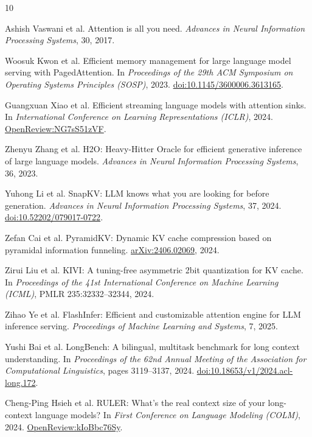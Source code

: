 \documentclass[10pt]{article}
\begin{document}
\begingroup
\small
\begin{thebibliography}{10}
\setlength{\itemsep}{0.45em}
\setlength{\parsep}{0pt}

Ashish Vaswani et al.
\newblock Attention is all you need.
\newblock \emph{Advances in Neural Information Processing Systems}, 30, 2017.

Woosuk Kwon et al.
\newblock Efficient memory management for large language model serving with PagedAttention.
\newblock In \emph{Proceedings of the 29th ACM Symposium on Operating Systems
Principles (SOSP)}, 2023.  \href{https://doi.org/10.1145/3600006.3613165}{doi:10.1145/3600006.3613165}.

Guangxuan Xiao et al.
\newblock Efficient streaming language models with attention sinks.
\newblock In \emph{International Conference on Learning Representations (ICLR)},
2024.  \href{https://openreview.net/forum?id=NG7sS51zVF}{OpenReview:NG7sS51zVF}.

Zhenyu Zhang et al.
\newblock H2O: Heavy-Hitter Oracle for efficient generative inference of large language models.
\newblock \emph{Advances in Neural Information Processing Systems}, 36, 2023.

Yuhong Li et al.
\newblock SnapKV: LLM knows what you are looking for before generation.
\newblock \emph{Advances in Neural Information Processing Systems}, 37, 2024.
\href{https://doi.org/10.52202/079017-0722}{doi:10.52202/079017-0722}.

Zefan Cai et al.
\newblock PyramidKV: Dynamic KV cache compression based on pyramidal information funneling.
\newblock \href{https://arxiv.org/abs/2406.02069}{arXiv:2406.02069}, 2024.

Zirui Liu et al.
\newblock KIVI: A tuning-free asymmetric 2bit quantization for KV cache.
\newblock In \emph{Proceedings of the 41st International Conference on Machine
Learning (ICML)}, PMLR 235:32332--32344, 2024.

Zihao Ye et al.
\newblock FlashInfer: Efficient and customizable attention engine for LLM inference serving.
\newblock \emph{Proceedings of Machine Learning and Systems}, 7, 2025.

Yushi Bai et al.
\newblock LongBench: A bilingual, multitask benchmark for long context understanding.
\newblock In \emph{Proceedings of the 62nd Annual Meeting of the Association for
Computational Linguistics}, pages 3119--3137, 2024.
\href{https://doi.org/10.18653/v1/2024.acl-long.172}{doi:10.18653/v1/2024.acl-long.172}.

Cheng-Ping Hsieh et al.
\newblock RULER: What's the real context size of your long-context language models?
\newblock In \emph{First Conference on Language Modeling (COLM)}, 2024.
\href{https://openreview.net/forum?id=kIoBbc76Sy}{OpenReview:kIoBbc76Sy}.

\end{thebibliography}
\endgroup
\end{document}

